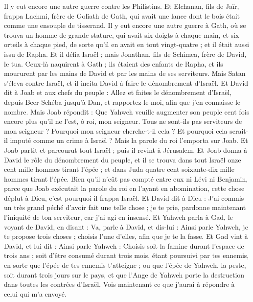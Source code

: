 \begin{multicols}{2}
Il y eut encore une autre guerre contre les Philistins. Et Elchanan, fils de Jaïr, frappa Lachmi, frère de Goliath de Gath, qui avait une lance dont le bois était comme une ensouple de tisserand.
Il y eut encore une autre guerre à Gath, où se trouva un homme de grande stature, qui avait six doigts à chaque main, et six orteils à chaque pied, de sorte qu'il en avait en tout vingt-quatre ; et il était aussi issu de Rapha.
Et il défia Israël ; mais Jonathan, fils de Schimea, frère de David, le tua.
Ceux-là naquirent à Gath ; ils étaient des enfants de Rapha, et ils moururent par les mains de David et par les mains de ses serviteurs.
\VerseOne{}Mais Satan s'éleva contre Israël, et il incita David à faire le dénombrement d'Israël.
Et David dit à Joab et aux chefs du peuple : Allez et faites le dénombrement d'Israël, depuis Beer-Schéba jusqu'à Dan, et rapportez-le-moi, afin que j'en connaisse le nombre.
Mais Joab répondit : Que Yahweh veuille augmenter son peuple cent fois encore plus qu'il ne l'est, ô roi, mon seigneur. Tous ne sont-ils pas serviteurs de mon seigneur ? Pourquoi mon seigneur cherche-t-il cela ? Et pourquoi cela serait-il imputé comme un crime à Israël ?
Mais la parole du roi l'emporta sur Joab. Et Joab partit et parcourut tout Israël ; puis il revint à Jérusalem.
Et Joab donna à David le rôle du dénombrement du peuple, et il se trouva dans tout Israël onze cent mille hommes tirant l'épée ; et dans Juda quatre cent soixante-dix mille hommes tirant l'épée.
Bien qu'il n'eût pas compté entre eux ni Lévi ni Benjamin, parce que Joab exécutait la parole du roi en l'ayant en abomination,
cette chose déplut à Dieu, c'est pourquoi il frappa Israël.
Et David dit à Dieu : J'ai commis un très grand péché d'avoir fait une telle chose ; je te prie, pardonne maintenant l'iniquité de ton serviteur, car j'ai agi en insensé.
Et Yahweh parla à Gad, le voyant de David, en disant :
Va, parle à David, et dis-lui : Ainsi parle Yahweh, je te propose trois choses ; choisis l'une d'elles, afin que je te la fasse.
Et Gad vint à David, et lui dit : Ainsi parle Yahweh :
Choisis soit la famine durant l'espace de trois ans ; soit d'être consumé durant trois mois, étant poursuivi par tes ennemis, en sorte que l'épée de tes ennemis t'atteigne ; ou que l'épée de Yahweh, la peste, soit durant trois jours sur le pays, et que l'Ange de Yahweh porte la destruction dans toutes les contrées d'Israël. Vois maintenant ce que j'aurai à répondre à celui qui m'a envoyé.

\end{multicols}
